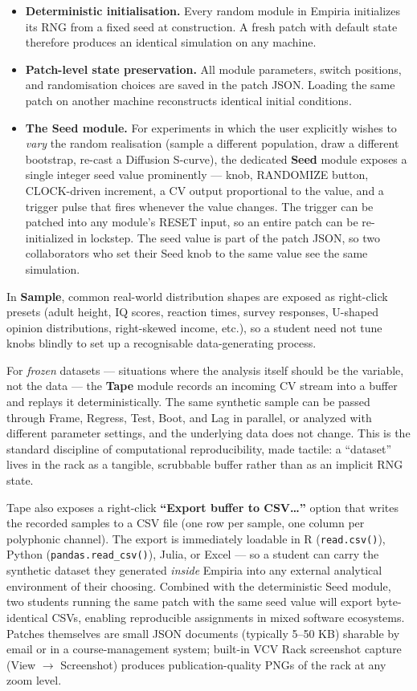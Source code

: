 \begin{itemize}
\item
  \textbf{Deterministic initialisation.} Every random module in Empiria
  initializes its RNG from a fixed seed at construction. A fresh patch
  with default state therefore produces an identical simulation on any
  machine.
\item
  \textbf{Patch-level state preservation.} All module parameters, switch
  positions, and randomisation choices are saved in the patch JSON.
  Loading the same patch on another machine reconstructs identical
  initial conditions.
\item
  \textbf{The Seed module.} For experiments in which the user explicitly
  wishes to \emph{vary} the random realisation (sample a different
  population, draw a different bootstrap, re-cast a Diffusion S-curve),
  the dedicated \textbf{Seed} module exposes a single integer seed value
  prominently --- knob, RANDOMIZE button, CLOCK-driven increment, a CV
  output proportional to the value, and a trigger pulse that fires
  whenever the value changes. The trigger can be patched into any
  module's RESET input, so an entire patch can be re-initialized in
  lockstep. The seed value is part of the patch JSON, so two
  collaborators who set their Seed knob to the same value see the same
  simulation.
\end{itemize}

In \textbf{Sample}, common real-world distribution shapes are exposed as
right-click presets (adult height, IQ scores, reaction times, survey
responses, U-shaped opinion distributions, right-skewed income, etc.),
so a student need not tune knobs blindly to set up a recognisable
data-generating process.

For \emph{frozen} datasets --- situations where the analysis itself
should be the variable, not the data --- the \textbf{Tape} module
records an incoming CV stream into a buffer and replays it
deterministically. The same synthetic sample can be passed through
Frame, Regress, Test, Boot, and Lag in parallel, or analyzed with
different parameter settings, and the underlying data does not change.
This is the standard discipline of computational reproducibility, made
tactile: a ``dataset'' lives in the rack as a tangible, scrubbable
buffer rather than as an implicit RNG state.

Tape also exposes a right-click \textbf{``Export buffer to
CSV\ldots{}''} option that writes the recorded samples to a CSV file
(one row per sample, one column per polyphonic channel). The export is
immediately loadable in R (\texttt{read.csv()}), Python
(\texttt{pandas.read\_csv()}), Julia, or Excel --- so a student can
carry the synthetic dataset they generated \emph{inside} Empiria into
any external analytical environment of their choosing. Combined with the
deterministic Seed module, two students running the same patch with the
same seed value will export byte-identical CSVs, enabling reproducible
assignments in mixed software ecosystems. Patches themselves are small
JSON documents (typically 5--50 KB) sharable by email or in a
course-management system; built-in VCV Rack screenshot capture (View $\rightarrow$
Screenshot) produces publication-quality PNGs of the rack at any zoom
level.

